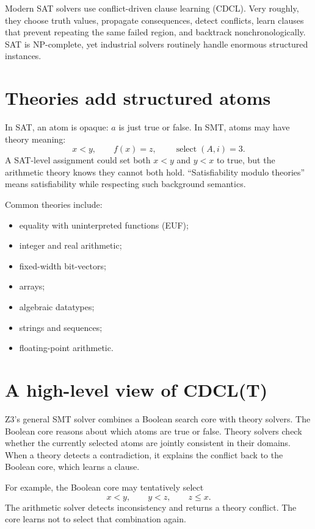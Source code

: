 \documentclass[10pt,letterpaper,oneside]{report}
\begin{document}
Modern SAT solvers use conflict-driven clause learning (CDCL). Very roughly, they choose truth values, propagate consequences, detect conflicts, learn clauses that prevent repeating the same failed region, and backtrack nonchronologically. SAT is NP-complete, yet industrial solvers routinely handle enormous structured instances.

\section{Theories add structured atoms}

In SAT, an atom is opaque: $a$ is just true or false. In SMT, atoms may have theory meaning:
\[
  x<y,
  \qquad f(x)=z,
  \qquad \operatorname{select}(A,i)=3.
\]
A SAT-level assignment could set both $x<y$ and $y<x$ to true, but the arithmetic theory knows they cannot both hold. ``Satisfiability modulo theories'' means satisfiability while respecting such background semantics.

Common theories include:

\begin{itemize}
\item equality with uninterpreted functions (EUF);
\item integer and real arithmetic;
\item fixed-width bit-vectors;
\item arrays;
\item algebraic datatypes;
\item strings and sequences;
\item floating-point arithmetic.
\end{itemize}

\section{A high-level view of CDCL(T)}

Z3's general SMT solver combines a Boolean search core with theory solvers. The Boolean core reasons about which atoms are true or false. Theory solvers check whether the currently selected atoms are jointly consistent in their domains. When a theory detects a contradiction, it explains the conflict back to the Boolean core, which learns a clause.

For example, the Boolean core may tentatively select
\[
  x<y,\qquad y<z,\qquad z\le x.
\]
The arithmetic solver detects inconsistency and returns a theory conflict. The core learns not to select that combination again.
\end{document}
